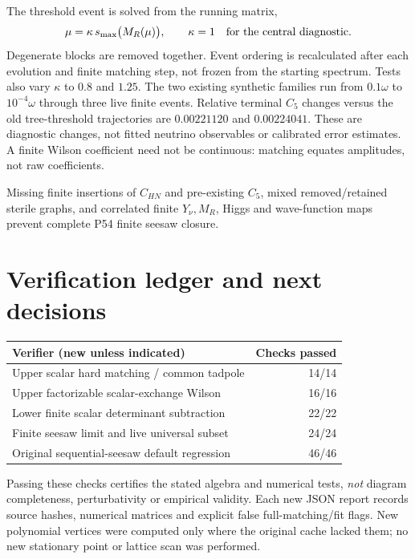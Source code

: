 \documentclass[11pt]{article}
\begin{document}
The threshold event is solved from the running matrix,
\begin{equation}
 \mu=\kappa\,s_{\max}\big(M_R(\mu)\big),
 \qquad \kappa=1\quad\hbox{for the central diagnostic}.
\end{equation}
Degenerate blocks are removed together. Event ordering is recalculated
after each evolution and finite matching step, not frozen from the
starting spectrum. Tests also vary $\kappa$ to $0.8$ and $1.25$.
The two existing synthetic families run from $0.1\omega$ to
$10^{-4}\omega$ through three live finite events. Relative terminal
$C_5$ changes versus the old tree-threshold trajectories are $0.00221120$
and $0.00224041$. These are diagnostic changes, not fitted neutrino
observables or calibrated error estimates. A finite Wilson coefficient
need not be continuous: matching equates amplitudes, not raw coefficients.

Missing finite insertions of $C_{HN}$ and pre-existing $C_5$, mixed
removed/retained sterile graphs, and correlated finite $Y_\nu,M_R$,
Higgs and wave-function maps prevent complete P54 finite seesaw closure.

\section{Verification ledger and next decisions}
\begin{center}
\begin{tabular}{lr}
\toprule
Verifier (new unless indicated) & Checks passed\\
\midrule
Upper scalar hard matching / common tadpole & 14/14\\
Upper factorizable scalar-exchange Wilson & 16/16\\
Lower finite scalar determinant subtraction & 22/22\\
Finite seesaw limit and live universal subset & 24/24\\
Original sequential-seesaw default regression & 46/46\\
\bottomrule
\end{tabular}
\end{center}
Passing these checks certifies the stated algebra and numerical tests,
\emph{not} diagram completeness, perturbativity or empirical validity.
Each new JSON report records source hashes, numerical matrices and
explicit false full-matching/fit flags. New polynomial vertices were
computed only where the original cache lacked them; no new stationary
point or lattice scan was performed.
\end{document}
